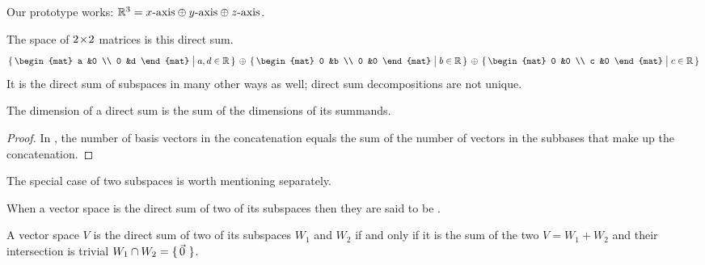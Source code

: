\begin{example}
Our prototype works: 
$\mathbb{R}^3=\text{$x$-axis}\oplus\text{$y$-axis}\oplus\text{$z$-axis}$. 
\end{example}

\begin{example}
The space of \( 2 \! \times \! 2 \) matrices is this direct sum.
\begin{equation*}
  \set{\begin{mat}
         a  &0  \\
         0  &d
       \end{mat}  \suchthat a,d\in\Re }
  \,\mbox{}\directsum\mbox{}\,
  \set{\begin{mat}
         0  &b  \\
         0  &0
       \end{mat}  \suchthat b\in\Re }
  \,\mbox{}\directsum\mbox{}\,
  \set{\begin{mat}
         0  &0  \\
         c  &0
       \end{mat}  \suchthat c\in\Re }
\end{equation*}
It is the direct sum of subspaces in many other ways as well; 
direct sum decompositions are not unique.
\end{example}

\begin{corollary} \label{cor:DirSumDimsAdd}
The dimension of a direct sum is the sum of the dimensions of its summands.
\end{corollary}

\begin{proof}
In ,
the number of basis vectors in the concatenation equals the sum of
the number of vectors in the subbases that make up the concatenation.
\end{proof}

The special case of two subspaces is worth mentioning separately.

\begin{definition}
When a vector space is the direct sum of two of its subspaces then they are
said to be .%
\end{definition}

\begin{lemma}
\label{le:DirectSumTwoSp}
A vector space \( V \) is the 
direct sum
of two of its subspaces \( W_1 \) and \( W_2 \) if and only if it is the
sum of the two \( V=W_1+W_2 \) and their intersection is trivial
\( W_1\cap W_2=\mbox{$\{\,\vec{0}\,\,\}$} \).
\end{lemma}

